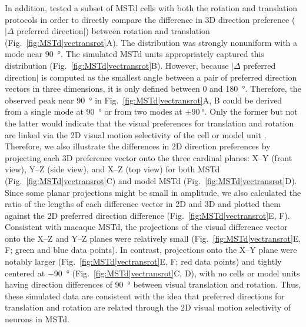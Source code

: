 In addition, \cite{Takahashi2007} tested a subset of \ac{MSTd} cells with 
both the rotation and translation protocols in order to directly compare 
the difference in 3D direction preference 
($|\Delta$ preferred direction$|$) between rotation and translation 
(Fig.~\ref{fig:MSTd|vectransrot}A). The distribution was strongly nonuniform
with a mode near \SI{90}{\degree}. The simulated \ac{MSTd} units appropriately
captured this distribution (Fig.~\ref{fig:MSTd|vectransrot}B). However, 
because $|\Delta$ preferred direction$|$ is computed as the smallest 
angle between a pair of preferred direction vectors in three dimensions, it is 
only defined between $0$ and \SI{180}{\degree}. Therefore, the observed peak
near \SI{90}{\degree} in Fig.~\ref{fig:MSTd|vectransrot}A, B could be derived
from a single mode at \SI{90}{\degree} or from two modes at 
$\pm \SI{90}{\degree}$. Only the former but not the latter would indicate 
that the visual preferences for translation and rotation are linked via the 
2D visual motion selectivity of the cell or model unit \citep{Takahashi2007}.
Therefore, we also illustrate the differences in 2D direction preferences by
projecting each 3D preference vector onto the three cardinal planes: 
X--Y (front view), Y--Z (side view), and X--Z (top view) for both \ac{MSTd}
(Fig.~\ref{fig:MSTd|vectransrot}C) and model \ac{MSTd}
(Fig.~\ref{fig:MSTd|vectransrot}D). Since some planar projections might be small
in amplitude, we also calculated the ratio of the lengths of each difference 
vector in 2D and 3D and plotted them against the 2D preferred direction 
difference (Fig.~\ref{fig:MSTd|vectransrot}E, F). Consistent with macaque 
\ac{MSTd}, the projections of the visual difference vector onto the X--Z and
Y--Z planes were relatively small (Fig.~\ref{fig:MSTd|vectransrot}E, F; 
green and blue data points). In contrast, projections onto the X--Y plane
were notably larger (Fig.~\ref{fig:MSTd|vectransrot}E, F; red data points) 
and tightly centered at \SI{-90}{\degree} (Fig.~\ref{fig:MSTd|vectransrot}C, D),
with no cells or model units having direction differences of \SI{+90}{\degree}
between visual translation and rotation. Thus, these simulated data are 
consistent with the idea that preferred directions for translation and rotation 
are related through the 2D visual motion selectivity of neurons in \ac{MSTd}.

